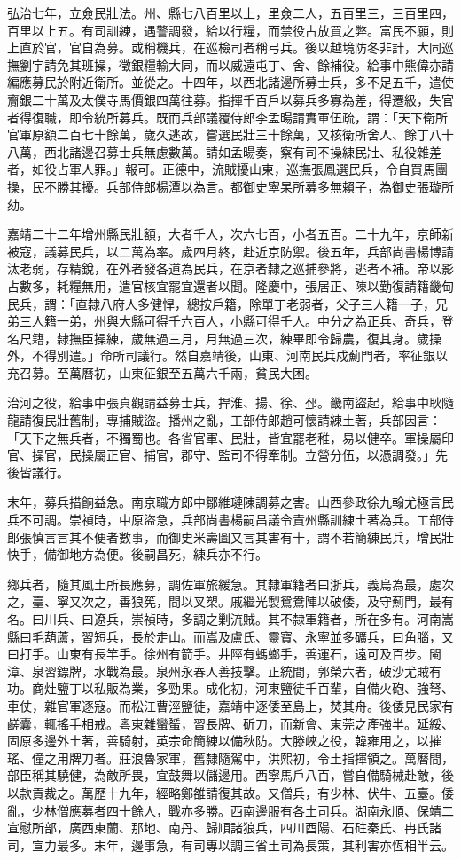 弘治七年，立僉民壯法。州、縣七八百里以上，里僉二人，五百里三，三百里四，百里以上五。有司訓練，遇警調發，給以行糧，而禁役占放買之弊。富民不願，則上直於官，官自為募。或稱機兵，在巡檢司者稱弓兵。後以越境防冬非計，大同巡撫劉宇請免其班操，徵銀糧輸大同，而以威遠屯丁、舍、餘補役。給事中熊偉亦請編應募民於附近衛所。並從之。十四年，以西北諸邊所募士兵，多不足五千，遣使齎銀二十萬及太僕寺馬價銀四萬往募。指揮千百戶以募兵多寡為差，得遷級，失官者得復職，即令統所募兵。既而兵部議覆侍郎李孟暘請實軍伍疏，謂：「天下衛所官軍原額二百七十餘萬，歲久逃故，嘗選民壯三十餘萬，又核衛所舍人、餘丁八十八萬，西北諸邊召募士兵無慮數萬。請如孟暘奏，察有司不操練民壯、私役雜差者，如役占軍人罪。」報可。正德中，流賊擾山東，巡撫張鳳選民兵，令自買馬團操，民不勝其擾。兵部侍郎楊潭以為言。都御史寧杲所募多無賴子，為御史張璇所劾。

嘉靖二十二年增州縣民壯額，大者千人，次六七百，小者五百。二十九年，京師新被寇，議募民兵，以二萬為率。歲四月終，赴近京防禦。後五年，兵部尚書楊博請汰老弱，存精銳，在外者發各道為民兵，在京者隸之巡捕參將，逃者不補。帝以影占數多，耗糧無用，遣官核宜罷宜還者以聞。隆慶中，張居正、陳以勤復請籍畿甸民兵，謂：「直隸八府人多健悍，總按戶籍，除單丁老弱者，父子三人籍一子，兄弟三人籍一弟，州與大縣可得千六百人，小縣可得千人。中分之為正兵、奇兵，登名尺籍，隸撫臣操練，歲無過三月，月無過三次，練畢即令歸農，復其身。歲操外，不得別遣。」命所司議行。然自嘉靖後，山東、河南民兵戍薊門者，率征銀以充召募。至萬曆初，山東征銀至五萬六千兩，貧民大困。

治河之役，給事中張貞觀請益募士兵，捍淮、揚、徐、邳。畿南盜起，給事中耿隨龍請復民壯舊制，專捕賊盜。播州之亂，工部侍郎趙可懷請練土著，兵部因言：「天下之無兵者，不獨蜀也。各省官軍、民壯，皆宜罷老稚，易以健卒。軍操屬印官、操官，民操屬正官、捕官，郡守、監司不得牽制。立營分伍，以憑調發。」先後皆議行。

末年，募兵措餉益急。南京職方郎中鄒維璉陳調募之害。山西參政徐九翰尤極言民兵不可調。崇禎時，中原盜急，兵部尚書楊嗣昌議令責州縣訓練土著為兵。工部侍郎張慎言言其不便者數事，而御史米壽圖又言其害有十，謂不若簡練民兵，增民壯快手，備御地方為便。後嗣昌死，練兵亦不行。

鄉兵者，隨其風土所長應募，調佐軍旅緩急。其隸軍籍者曰浙兵，義烏為最，處次之，臺、寧又次之，善狼筅，間以叉槊。戚繼光製鴛鴦陣以破倭，及守薊門，最有名。曰川兵、曰遼兵，崇禎時，多調之剿流賊。其不隸軍籍者，所在多有。河南嵩縣曰毛葫蘆，習短兵，長於走山。而嵩及盧氏、靈寶、永寧並多礦兵，曰角腦，又曰打手。山東有長竿手。徐州有箭手。井陘有螞螂手，善運石，遠可及百步。閩漳、泉習鏢牌，水戰為最。泉州永春人善技擊。正統間，郭榮六者，破沙尤賊有功。商灶鹽丁以私販為業，多勁果。成化初，河東鹽徒千百輩，自備火砲、強弩、車仗，雜官軍逐寇。而松江曹涇鹽徒，嘉靖中逐倭至島上，焚其舟。後倭見民家有鹺囊，輒搖手相戒。粵東雜蠻蜑，習長牌、斫刀，而新會、東莞之產強半。延綏、固原多邊外土著，善騎射，英宗命簡練以備秋防。大滕峽之役，韓雍用之，以摧瑤、僮之用牌刀者。莊浪魯家軍，舊隸隨駕中，洪熙初，令土指揮領之。萬曆間，部臣稱其驍健，為敵所畏，宜鼓舞以儲邊用。西寧馬戶八百，嘗自備騎械赴敵，後以款貢裁之。萬歷十九年，經略鄭雒請復其故。又僧兵，有少林、伏牛、五臺。倭亂，少林僧應募者四十餘人，戰亦多勝。西南邊服有各土司兵。湖南永順、保靖二宣慰所部，廣西東蘭、那地、南丹、歸順諸狼兵，四川酉陽、石砫秦氏、冉氏諸司，宣力最多。末年，邊事急，有司專以調三省土司為長策，其利害亦恆相半云。

